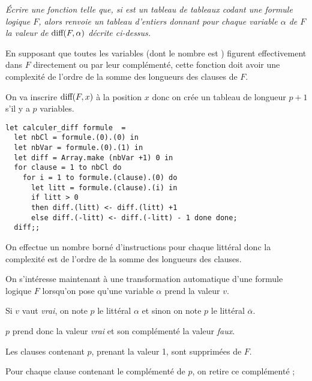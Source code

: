 \begin{Exercise}\it
Écrire une fonction  telle que, si  est un tableau de tableaux codant une formule logique $F$, alors  renvoie un tableau d’entiers donnant pour chaque variable $\alpha$ de $F$ la valeur de $\text{\rm diff}(F, \alpha )$ décrite ci-dessus. 

En supposant que toutes les variables (dont le nombre est ) figurent effectivement dans $F$ directement ou par leur complémenté, cette fonction doit avoir une complexité de l’ordre de la somme des longueurs des clauses de $F$.
\end{Exercise}
\begin{Answer}
On va inscrire $\text{\rm diff}(F,x)$ à la position $x$ donc on crée un tableau de longueur $p+1$ s'il y a $p$ variables.
\begin{lstlisting}
let calculer_diff formule  =
  let nbCl = formule.(0).(0) in
  let nbVar = formule.(0).(1) in
  let diff = Array.make (nbVar +1) 0 in
  for clause = 1 to nbCl do
    for i = 1 to formule.(clause).(0) do
      let litt = formule.(clause).(i) in
      if litt > 0 
      then diff.(litt) <- diff.(litt) +1
      else diff.(-litt) <- diff.(-litt) - 1 done done;
  diff;;
\end{lstlisting}
On effectue un nombre borné d'instructions pour chaque littéral donc la complexité est de l'ordre de la somme des longueurs des clauses.
\end{Answer}
\medskip

On s’intéresse maintenant à une transformation automatique d’une formule logique $F$ lorsqu’on pose qu’une variable $\alpha$ prend la valeur $v$.

Si $v$ vaut {\it vrai}, on note $p$ le littéral $\alpha$ et sinon on note $p$ le littéral $\overline \alpha$. 

$p$ prend donc la valeur {\it vrai} et son complémenté la valeur {\it faux}.

Les clauses contenant $p$, prenant la valeur 1, sont supprimées de $F$. 

Pour chaque clause contenant le complémenté de $p$, on retire ce complémenté ; 

